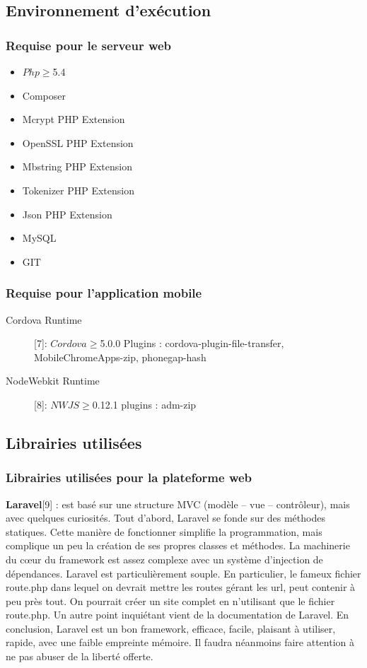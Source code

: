 \documentclass[12pt, ChapStyle1, oneside]{./Styles/Dea_Gsm}
\begin{document}
\subsection{Environnement d’exécution}
\subsubsection{Requise pour le serveur web}
\begin{itemize}
\item $Php \geq $5.4

\item Composer
\item Mcrypt PHP Extension
\item OpenSSL PHP Extension
\item Mbstring PHP Extension
\item Tokenizer PHP Extension
\item Json PHP Extension
\item MySQL
\item GIT
\end{itemize}
\subsubsection{Requise pour l'application mobile}
\begin{description}
\item[Cordova Runtime] [7]: $Cordova \geq $5.0.0
Plugins : cordova-plugin-file-transfer, MobileChromeApps-zip, phonegap-hash
\item[NodeWebkit Runtime] [8]: $NWJS \geq $0.12.1
plugins : adm-zip
\end{description}
\subsection{Librairies utilisées}
\subsubsection{Librairies utilisées pour la plateforme web}
\textbf{Laravel}[9] : est basé sur une structure MVC (modèle – vue – contrôleur), mais avec quelques curiosités. Tout d’abord, Laravel se fonde sur des méthodes statiques. Cette manière de fonctionner simplifie la programmation, mais complique un peu la création de ses propres classes et méthodes. La machinerie du cœur du framework est assez complexe avec un système d’injection de dépendances.
Laravel est particulièrement souple. En particulier, le fameux fichier route.php dans lequel on devrait mettre les routes gérant les url, peut contenir à peu près tout. On pourrait créer un site complet en n’utilisant que le fichier route.php. Un autre point inquiétant vient de la documentation de Laravel.
En conclusion, Laravel est un bon framework, efficace, facile, plaisant à utiliser, rapide, avec une faible empreinte mémoire. Il faudra néanmoins faire attention à ne pas abuser de la liberté offerte.
\end{document}
